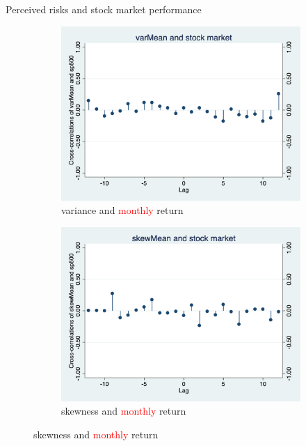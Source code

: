 \documentclass{beamer}
\begin{document}
\begin{frame}{Perceived risks and stock market performance}
	
	\begin{figure}
		\centering
		\label{corr_stk_monthly}
		\begin{subfigure}[b]{0.45\textwidth}
			\centering
			\caption{variance and \textcolor{red}{monthly} return}
			\includegraphics[width=\textwidth]{figures/corr_varMean_stk_monthly}
		\end{subfigure}
		\begin{subfigure}[b]{0.45\textwidth}
			\centering
			\caption{skewness and \textcolor{red}{monthly} return}
			\includegraphics[width=\textwidth]{figures/corr_skewMean_stk_monthly}
		\end{subfigure}
	\end{figure}
\end{frame}
\end{document}
